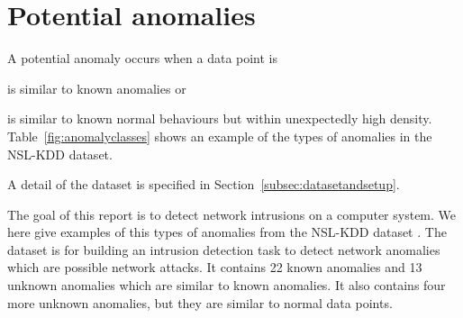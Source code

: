 \section{Potential anomalies}
\label{sec:potentialanomalies}
A potential anomaly occurs when a data point is \begin{inparaenum}
\item is similar to known anomalies %
or 
\item is similar to known normal behaviours but within unexpectedly high density.
Table~\ref{fig:anomalyclasses} shows an example of the types of anomalies in the NSL-KDD dataset. 
\end{inparaenum} 
A detail of the dataset is specified in Section~\ref{subsec:datasetandsetup}. 

The goal of this report is to detect network intrusions on a computer system. 
We here give examples of this types of anomalies from the NSL-KDD dataset \cite{tavallaee09}. 
The dataset is for building an intrusion detection task to detect network anomalies which are possible network attacks. 
It contains 22 known anomalies and 13 unknown anomalies which are similar to known anomalies. 
It also contains four more unknown anomalies, but they are similar to normal data points.

